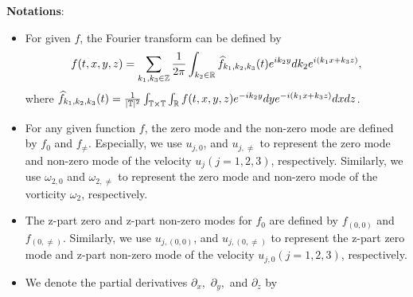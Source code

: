 \documentclass[12pt, reqno]{amsart}
\numberwithin{equation}{section}
\begin{document}
	\noindent\textbf{Notations}:
	\begin{itemize}
		\item 
		For given $f$, the Fourier transform can be defined by
		\begin{equation}
			f(t,x,y,z)=\sum_{k_1,k_3\in\mathbb{Z}}\frac{1}{2\pi}\int_{k_2\in \mathbb{R}}\widehat{f}_{k_1,k_2,k_3}(t){\rm e}^{ik_2y}dk_2{\rm e}^{i(k_1x+k_3z)}, \nonumber
		\end{equation}
		where $\widehat{f}_{k_1,k_2,k_3}(t)=\frac{1}{|\mathbb{T}|^2}\int_{\mathbb{T}\times\mathbb{T}}\int_{\mathbb{R}}{f}(t,x,y,z){\rm e}^{-ik_2y}dy{\rm e}^{-i(k_1x+k_3z)}dxdz$.
		
		
		\item 
		For any given function $f$,  the zero mode and the non-zero mode
		are defined by $f_0$ and $f_{\neq}.$
		Especially, we use $u_{j,0}$, and $u_{j,\neq}$ to represent the zero mode
		and non-zero mode of the velocity $u_{j} (j=1,2,3)$, respectively.
		Similarly, we use $\omega_{2,0}$ and $\omega_{2,\neq}$ to represent the zero mode
		and non-zero mode of the vorticity $\omega_2$, respectively.
		\item The z-part zero and z-part non-zero modes for $f_0$ are defined by
		$f_{(0,0)}$ and $f_{(0,\neq)}.$
		Similarly, we use $u_{j,(0,0)}$, and $u_{j,(0,\neq)}$ to represent the z-part zero mode
		and z-part non-zero mode of the velocity $u_{j,0} (j=1,2,3)$, respectively.
		\item  We denote the partial derivatives $\partial_x,$ $\partial_y,$ and $\partial_z$ by  

\end{itemize}
\end{document}
